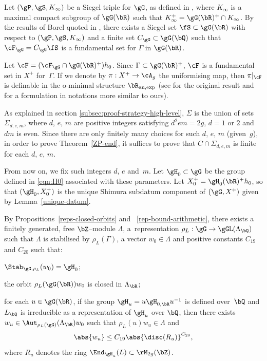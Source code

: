 Let $(\gP, \gS, K_\infty)$ be a Siegel triple for $\gG$, as defined in \cite[\S2B]{Orr18}, where $K_\infty$ is a maximal compact subgroup of $\gG(\bR)$ such that $K^+_\infty=\gG(\bR)^+\cap K_\infty$.
By the results of Borel quoted in \cite[\S2D]{Orr18}, there exists a Siegel set $\fS \subset \gG(\bR)$ with respect to $(\gP, \gS, K_\infty)$ and a finite set $C_\gG\subset\gG(\bQ)$ such that $\cF_{\gG}=C_\gG\fS$ is a fundamental set for $\Gamma$ in $\gG(\bR)$.

Let $\cF = (\cF_\gG \cap \gG(\bR)^+) h_0$. Since $\Gamma \subset \gG(\bR)^+$, $\cF$ is a fundamental set in $X^+$ for~$\Gamma$. If we denote by $\pi:X^+\to\cA_g$ the uniformising map, then $\pi|_{\cF}$ is definable in the o-minimal structure $\bR_{\rm an,exp}$ (see \cite{PS10} for the original result and \cite{kuy:ax-lindemann} for a formulation in notations more similar to ours).

As explained in section \ref{subsec:proof-strategy-high-level}, $\Sigma$ is the union of sets $\Sigma_{d,e,m}$, where $d$, $e$, $m$ are positive integers satisfying $d^2em=2g$, $d=1$ or $2$ and $dm$ is even.
Since there are only finitely many choices for such $d$, $e$, $m$ (given~$g$), in order to prove Theorem~\ref{ZP-end}, it suffices to prove that $C \cap \Sigma_{d,e,m}$ is finite for each $d$, $e$, $m$.

From now on, we fix such integers $d$, $e$ and~$m$. Let $\gH_0 \subset \gG$ be the group defined in \eqref{eqn:H0} associated with these parameters.
Let $X_0^+ = \gH_0(\bR)^+h_0$, so that $(\gH_0, X_0^+)$ is the unique Shimura subdatum component of $(\gG, X^+)$ given by Lemma~\ref{unique-datum}.

By Propositions~\ref{reps-closed-orbits} and~ \ref{rep-bound-arithmetic}, there exists a finitely generated, free $\bZ$--module $\Lambda$, a~re\-pre\-sentation $\rho_L:\gG\to\gGL(\Lambda_\bQ)$ such that $\Lambda$ is stabilised by $\rho_L(\Gamma)$, a vector $w_0\in\Lambda$ and positive constants $C_{19}$ and $C_{20}$ such that:
\begin{enumeratei}
\item $\Stab_{\gG,\rho_L}(w_0) = \gH_0$;

\item the orbit $\rho_L(\gG(\bR))w_0$ is closed in $\Lambda_\bR$;

\item for each $u \in \gG(\bR)$, if the group $\gH_u = u \gH_{0,\bR} u^{-1}$ is defined over~$\bQ$ and $L_\bQ$ is irreducible as a representation of $\gH_u$ over $\bQ$, then there exists $w_u \in \Aut_{\rho_L(\gG)}(\Lambda_\bR) w_0$ such that $\rho_L(u) w_u \in \Lambda$ and
\[
\abs{w_u} \leq C_{19} \abs{\disc(R_u)}^{C_{20}},
\]
where $R_u$ denotes the ring $\End_{\gH_u}(L) \subset \rM_{2g}(\bZ)$.
\end{enumeratei}

